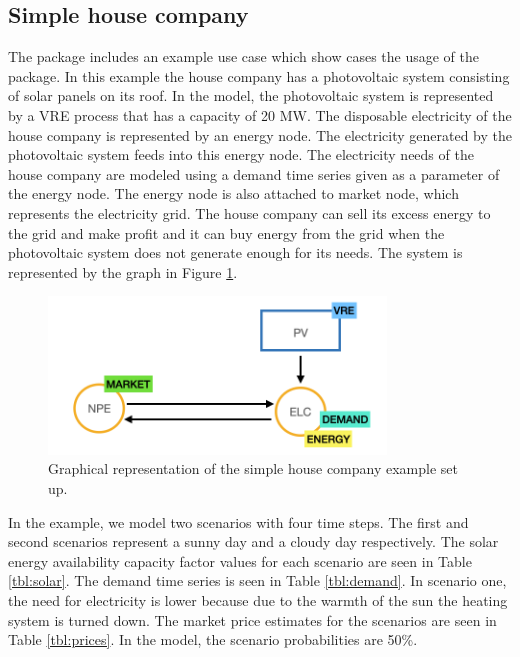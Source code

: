 \documentclass{article}
\begin{document}
\subsection{Simple house company}
The package includes an example use case which show cases the usage of the package. In this example the house company has a photovoltaic system consisting of solar panels on its roof. In the model, the photovoltaic system is represented by a VRE process that has a capacity of 20 MW. The disposable electricity of the house company is represented by an energy node. The electricity generated by the photovoltaic system feeds into this energy node. The electricity needs of the house company are modeled using a demand time series given as a parameter of the energy node. The energy node is also attached to market node, which represents the electricity grid. The house company can sell its excess energy to the grid and make profit and it can buy energy from the grid when the photovoltaic system does not generate enough for its needs. The system is represented by the graph in Figure \ref{fig:simple_house_company}.

\begin{figure}[H]
\centering
\includegraphics[width=0.8\textwidth]{Simple_house_company.png}
\caption{Graphical representation of the simple house company example set up.}
\label{fig:simple_house_company}
\end{figure}

In the example, we model two scenarios with four time steps. The first and second scenarios represent a sunny day and a cloudy day respectively. The solar energy availability capacity factor values for each scenario are seen in Table \ref{tbl:solar}. The demand time series is seen in Table \ref{tbl:demand}. In scenario one, the need for electricity is lower because due to the warmth of the sun the heating system is turned down. The market price estimates for the scenarios are seen in Table \ref{tbl:prices}. In the model, the scenario probabilities are 50\%.
\end{document}
